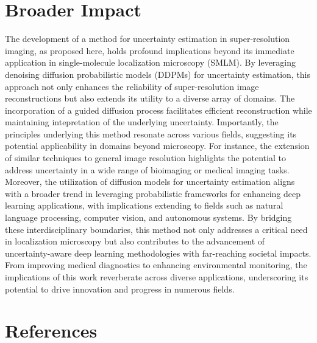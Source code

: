 \documentclass{article}
\begin{document}
\section{Broader Impact}

The development of a method for uncertainty estimation in super-resolution imaging, as proposed here, holds profound implications beyond its immediate application in single-molecule localization microscopy (SMLM). By leveraging denoising diffusion probabilistic models (DDPMs) for uncertainty estimation, this approach not only enhances the reliability of super-resolution image reconstructions but also extends its utility to a diverse array of domains. The incorporation of a guided diffusion process facilitates efficient reconstruction while maintaining intepretation of the underlying uncertainty. Importantly, the principles underlying this method resonate across various fields, suggesting its potential applicability in domains beyond microscopy. For instance, the extension of similar techniques to general image resolution highlights the potential to address uncertainty in a wide range of bioimaging or medical imaging tasks. Moreover, the utilization of diffusion models for uncertainty estimation aligns with a broader trend in leveraging probabilistic frameworks for enhancing deep learning applications, with implications extending to fields such as natural language processing, computer vision, and autonomous systems. By bridging these interdisciplinary boundaries, this method not only addresses a critical need in localization microscopy but also contributes to the advancement of uncertainty-aware deep learning methodologies with far-reaching societal impacts. From improving medical diagnostics to enhancing environmental monitoring, the implications of this work reverberate across diverse applications, underscoring its potential to drive innovation and progress in numerous fields.

\section*{References}
\end{document}
